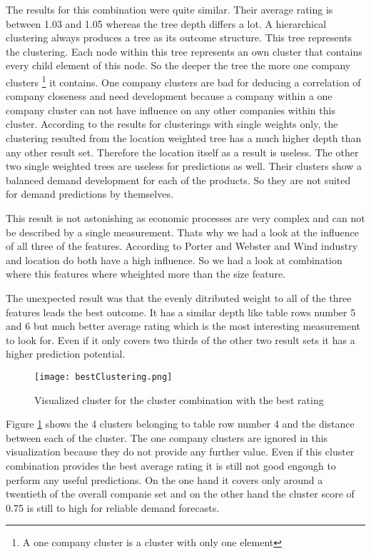 The results for this combination were quite similar. Their average rating is between 1.03 and 1.05 whereas
the tree depth differs a lot. A hierarchical clustering always produces a tree as its outcome structure. This
tree represents the clustering. Each node within this tree represents an own cluster that contains every child element
of this node. So the deeper the tree the more one company clusters \footnote{A one company cluster is a cluster with only one element}
it contains. One company clusters are bad for deducing a correlation of company closeness and need development because
a company within a one company cluster can not have influence on any other companies within this cluster.
According to the results for clusterings with single weights only, the clustering resulted from the location weighted
tree has a much higher depth than any other result set. Therefore the location itself as a result is useless.
The other two single weighted trees are useless for predictions as well. Their clusters show a balanced demand
development for each of the products. So they are not suited for demand predictions by themselves.

This result is not astonishing as economic processes are very complex and can not be described by a single
measurement. Thats why we had a look at the influence of all three of the features. According to
Porter \cite{CompanyClusters} and Webster and Wind \cite{BusinessBuyingBehavior} industry and location
do both have a high influence. So we had a look at combination where this features where wheighted more than
the size feature.

The unexpected result was that the evenly ditributed weight to all of the three features leads the best outcome.
It has a similar depth like table rows number 5 and 6 but much better average rating which is the most interesting
measurement to look for. Even if it only covers two thirds of the other two result sets it has a higher prediction potential.

\begin{figure}[ht]
\texttt{[image: bestClustering.png]}
\centering
\caption{Visualized cluster for the cluster combination with the best rating}
\label{fig:bestClustering}
\end{figure}

Figure \ref{fig:bestClustering} shows the 4 clusters belonging to table row number 4 and the distance between each
of the cluster. The one company clusters are ignored in this visualization because they do not provide any
further value. Even if this cluster combination provides the best average rating it is still not good engough
to perform any useful predictions. On the one hand it covers only around a twentieth of the overall companie set
and on the other hand the cluster score of 0.75 is still to high for reliable demand forecasts.

